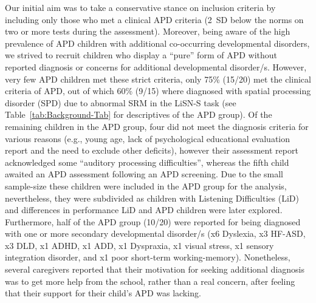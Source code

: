 \documentclass[a4paper, twoside]{templates/ociamthesis}
\begin{document}
Our initial aim was to take a conservative stance on inclusion criteria by including only those who met a clinical APD criteria (2~SD below the norms on two or more tests during the assessment). Moreover, being aware of the high prevalence of APD children with additional co-occurring developmental disorders, we strived to recruit children who display a ``pure'' form of APD without reported diagnosis or concerns for additional developmental disorder/s. However, very few APD children met these strict criteria, only 75\% (15/20) met the clinical criteria of APD, out of which 60\% (9/15) where diagnosed with spatial processing disorder (SPD) due to abnormal SRM in the LiSN-S task (see Table~\ref{tab:Background-Tab} for descriptives of the APD group). Of the remaining children in the APD group, four did not meet the diagnosis criteria for various reasons (e.g., young age, lack of psychological educational evaluation report and the need to exclude other deficits), however their assessment report acknowledged some ``auditory processing difficulties'', whereas the fifth child awaited an APD assessment following an APD screening. Due to the small sample-size these children were included in the APD group for the analysis, nevertheless, they were subdivided as children with Listening Difficulties (LiD) and differences in performance LiD and APD children were later explored. Furthermore, half of the APD group (10/20) were reported for being diagnosed with one or more secondary developmental disorder/s (x6 Dyslexia, x3 HF-ASD, x3 DLD, x1 ADHD, x1 ADD, x1 Dyspraxia, x1 visual stress, x1 sensory integration disorder, and x1 poor short-term working-memory). Nonetheless, several caregivers reported that their motivation for seeking additional diagnosis was to get more help from the school, rather than a real concern, after feeling that their support for their child's APD was lacking.\\
\end{document}
